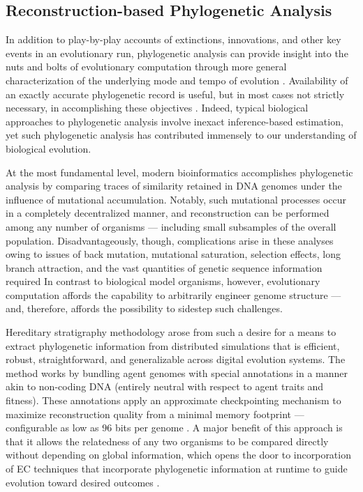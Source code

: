 \subsection{Reconstruction-based Phylogenetic Analysis}

In addition to play-by-play accounts of extinctions, innovations, and other key events in an evolutionary run, phylogenetic analysis can provide insight into the nuts and bolts of evolutionary computation through more general characterization of the underlying mode and tempo of evolution \citep{moreno2023toward,hernandez2022can,shahbandegan2022untangling,lewinsohn2023statedependent}.
Availability of an exactly accurate phylogenetic record is useful, but in most cases not strictly necessary, in accomplishing these objectives \citep{moreno2025ecology}.
Indeed, typical biological approaches to phylogenetic analysis involve inexact inference-based estimation, yet such phylogenetic analysis has contributed immensely to our understanding of biological evolution.

At the most fundamental level, modern bioinformatics accomplishes phylogenetic analysis by comparing traces of similarity retained in DNA genomes under the influence of mutational accumulation.
Notably, such mutational processes occur in a completely decentralized manner, and reconstruction can be performed among any number of organisms --- including small subsamples of the overall population.
Disadvantageously, though, complications arise in these analyses owing to issues of back mutation, mutational saturation, selection effects, long branch attraction, and the vast quantities of genetic sequence information required \citep{TODO}
In contrast to biological model organisms, however, evolutionary computation affords the capability to arbitrarily engineer genome structure --- and, therefore, affords the possibility to sidestep such challenges.

Hereditary stratigraphy methodology arose from such a desire for a means to extract phylogenetic information from distributed simulations that is efficient, robust, straightforward, and generalizable across digital evolution systems.
The method works by bundling agent genomes with special annotations in a manner akin to non-coding DNA (entirely neutral with respect to agent traits and fitness).
These annotations apply an approximate checkpointing mechanism to maximize reconstruction quality from a minimal memory footprint --- configurable as low as 96 bits per genome \citep{moreno2022hereditary}.
A major benefit of this approach is that it allows the relatedness of any two organisms to be compared directly without depending on global information, which opens the door to incorporation of EC techniques that incorporate phylogenetic information at runtime to guide evolution toward desired outcomes \citep{lalejini2024phylogenyinformed,lalejini2024runtime,murphy2008simple,burke2003increased}.

